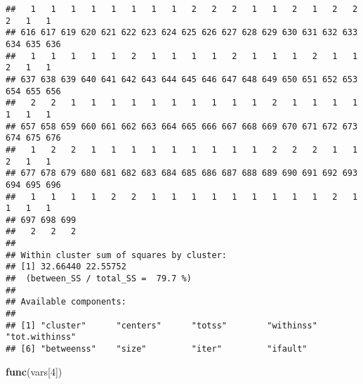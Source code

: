 \documentclass[]{article}
\newenvironment{Shaded}{\begin{snugshade}}{\end{snugshade}}
\newcommand{\DecValTok}[1]{\textcolor[rgb]{0.00,0.00,0.81}{#1}}
\newcommand{\KeywordTok}[1]{\textcolor[rgb]{0.13,0.29,0.53}{\textbf{#1}}}
\newcommand{\NormalTok}[1]{#1}
\begin{document}
\begin{verbatim}
##   1   1   1   1   1   1   1   1   2   2   2   1   1   2   1   2   2   2   1   1 
## 616 617 619 620 621 622 623 624 625 626 627 628 629 630 631 632 633 634 635 636 
##   1   1   1   1   1   2   1   1   1   1   2   1   1   1   2   1   1   2   1   1 
## 637 638 639 640 641 642 643 644 645 646 647 648 649 650 651 652 653 654 655 656 
##   2   2   1   1   1   1   1   1   1   1   1   1   2   1   1   1   1   1   1   1 
## 657 658 659 660 661 662 663 664 665 666 667 668 669 670 671 672 673 674 675 676 
##   1   2   2   1   1   1   1   1   1   1   1   1   2   2   2   1   1   2   1   1 
## 677 678 679 680 681 682 683 684 685 686 687 688 689 690 691 692 693 694 695 696 
##   1   1   1   1   2   2   1   1   1   1   1   1   1   1   1   2   1   1   1   1 
## 697 698 699 
##   2   2   2 
## 
## Within cluster sum of squares by cluster:
## [1] 32.66440 22.55752
##  (between_SS / total_SS =  79.7 %)
## 
## Available components:
## 
## [1] "cluster"      "centers"      "totss"        "withinss"     "tot.withinss"
## [6] "betweenss"    "size"         "iter"         "ifault"
\end{verbatim}

\begin{Shaded}
\begin{Highlighting}[]
\KeywordTok{func}\NormalTok{(vars[}\DecValTok{4}\NormalTok{])}
\end{Highlighting}
\end{Shaded}
\end{document}
